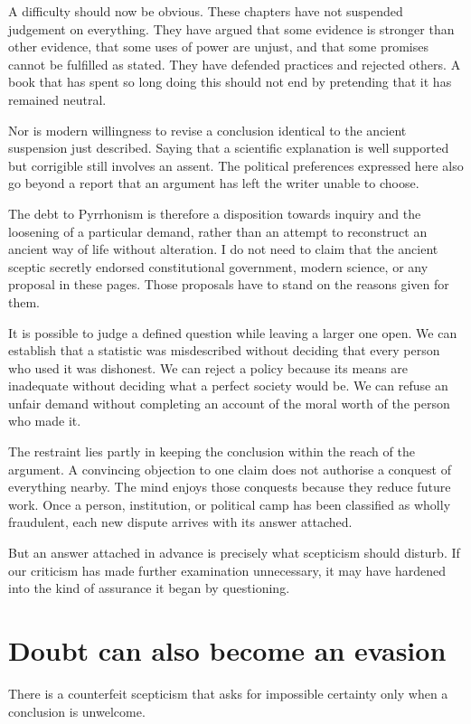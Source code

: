 \documentclass[12pt,a4paper]{book}
\begin{document}
A difficulty should now be obvious. These chapters have not suspended judgement on everything. They have argued that some evidence is stronger than other evidence, that some uses of power are unjust, and that some promises cannot be fulfilled as stated. They have defended practices and rejected others. A book that has spent so long doing this should not end by pretending that it has remained neutral.

Nor is modern willingness to revise a conclusion identical to the ancient suspension just described. Saying that a scientific explanation is well supported but corrigible still involves an assent. The political preferences expressed here also go beyond a report that an argument has left the writer unable to choose.

The debt to Pyrrhonism is therefore a disposition towards inquiry and the loosening of a particular demand, rather than an attempt to reconstruct an ancient way of life without alteration. I do not need to claim that the ancient sceptic secretly endorsed constitutional government, modern science, or any proposal in these pages. Those proposals have to stand on the reasons given for them.

It is possible to judge a defined question while leaving a larger one open. We can establish that a statistic was misdescribed without deciding that every person who used it was dishonest. We can reject a policy because its means are inadequate without deciding what a perfect society would be. We can refuse an unfair demand without completing an account of the moral worth of the person who made it.

The restraint lies partly in keeping the conclusion within the reach of the argument. A convincing objection to one claim does not authorise a conquest of everything nearby. The mind enjoys those conquests because they reduce future work. Once a person, institution, or political camp has been classified as wholly fraudulent, each new dispute arrives with its answer attached.

But an answer attached in advance is precisely what scepticism should disturb. If our criticism has made further examination unnecessary, it may have hardened into the kind of assurance it began by questioning.

\section*{Doubt can also become an evasion}

There is a counterfeit scepticism that asks for impossible certainty only when a conclusion is unwelcome.
\end{document}
